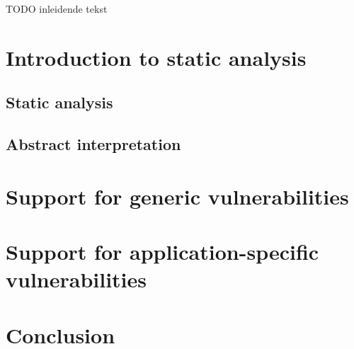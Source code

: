 TODO inleidende tekst

\section{Introduction to static analysis}
\label{subsec:staticAnalysis}

\subsection{Static analysis}

\subsection{Abstract interpretation}

\section{Support for generic vulnerabilities}
\section{Support for application-specific vulnerabilities}
\section{Conclusion}
